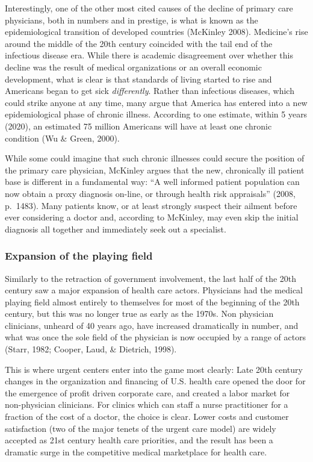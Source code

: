\documentclass[12pt,twoside]{reedthesis}
\begin{document}
  Interestingly, one of the other most cited causes of the decline of
  primary care physicians, both in numbers and in prestige, is what is
  known as the epidemiological transition of developed countries (McKinley
  2008). Medicine's rise around the middle of the 20th century coincided
  with the tail end of the infectious disease era. While there is academic
  disagreement over whether this decline was the result of medical
  organizations or an overall economic development, what is clear is that
  standards of living started to rise and Americans began to get sick
  \emph{differently}. Rather than infectious diseases, which could strike
  anyone at any time, many argue that America has entered into a new
  epidemiological phase of chronic illness. According to one estimate,
  within 5 years (2020), an estimated 75 million Americans will have at
  least one chronic condition (Wu \& Green, 2000).
  
  While some could imagine that such chronic illnesses could secure the
  position of the primary care physician, McKinley argues that the new,
  chronically ill patient base is different in a fundamental way: ``A well
  informed patient population can now obtain a proxy diagnosis on-line, or
  through health risk appraisals'' (2008, p.~1483). Many patients know, or
  at least strongly suspect their ailment before ever considering a doctor
  and, according to McKinley, may even skip the initial diagnosis all
  together and immediately seek out a specialist.
  
  \subsubsection*{Expansion of the playing
  field}\label{expansion-of-the-playing-field}
  
  Similarly to the retraction of government involvement, the last half of
  the 20th century saw a major expansion of health care actors. Physicians
  had the medical playing field almost entirely to themselves for most of
  the beginning of the 20th century, but this was no longer true as early
  as the 1970s. Non physician clinicians, unheard of 40 years ago, have
  increased dramatically in number, and what was once the sole field of
  the physician is now occupied by a range of actors (Starr, 1982; Cooper,
  Laud, \& Dietrich, 1998).
  
  This is where urgent centers enter into the game most clearly: Late 20th
  century changes in the organization and financing of U.S. health care
  opened the door for the emergence of profit driven corporate care, and
  created a labor market for non-physician clinicians. For clinics which
  can staff a nurse practitioner for a fraction of the cost of a doctor,
  the choice is clear. Lower costs and customer satisfaction (two of the
  major tenets of the urgent care model) are widely accepted as 21st
  century health care priorities, and the result has been a dramatic surge
  in the competitive medical marketplace for health care.
  
\end{document}
